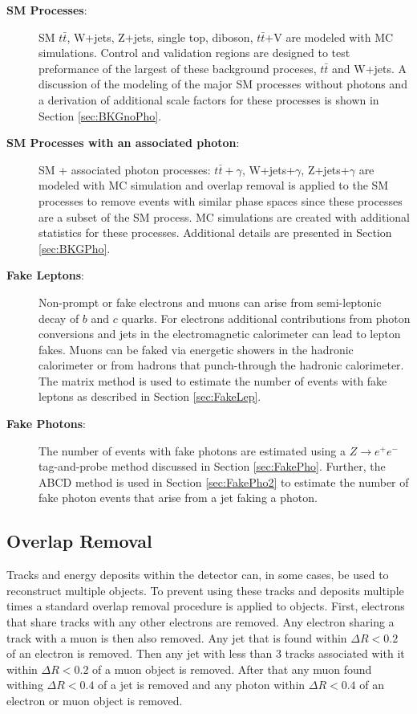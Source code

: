 \begin{description}
\item[\textbf{SM Processes}:]  SM $t\bar{t}$, W+jets, Z+jets, single top, diboson, $t\bar{t}$+V are modeled with MC simulations.  Control and validation regions are designed to test preformance of the largest of these background proceses, $t\bar{t}$ and W+jets.  A discussion of the modeling of the major SM processes without photons and a derivation of additional scale factors for these processes is shown in Section \ref{sec:BKGnoPho}.

\item[\textbf{SM Processes with an associated photon}:] SM + associated photon processes: $t\bar{t}+\gamma$, W+jets+$\gamma$, Z+jets+$\gamma$ are modeled with MC simulation and overlap removal is applied to the SM processes to remove events with similar phase spaces since these processes are a subset of the SM process.  MC simulations are created with additional statistics for these processes.  Additional details are presented in Section \ref{sec:BKGPho}.

\item[\textbf{Fake Leptons}:] Non-prompt or fake electrons and muons can arise from semi-leptonic decay of $b$ and $c$ quarks.  For electrons additional contributions from photon conversions and jets in the electromagnetic calorimeter can lead to lepton fakes.  Muons can be faked via energetic showers in the hadronic calorimeter or from hadrons that punch-through the hadronic calorimeter.  The matrix method is used to estimate the number of events with fake leptons as described in Section \ref{sec:FakeLep}.

\item[\textbf{Fake Photons}:] The number of events with fake photons are estimated using a $Z\rightarrow e^+ e^-$ tag-and-probe method discussed in Section \ref{sec:FakePho}.  Further, the ABCD method is used in Section \ref{sec:FakePho2} to estimate the number of fake photon events that arise from a jet faking a photon.

\end{description}
\subsection{Overlap Removal}
\label{sec:OverlapRemoval}
Tracks and energy deposits within the detector can, in some cases, be used to reconstruct multiple objects.  To prevent using these tracks and deposits multiple times a standard overlap removal procedure is applied to objects.  First, electrons that share tracks with any other electrons are removed.  Any electron sharing a track with a muon is then also removed.  Any jet that is found within  $\Delta R < 0.2$ of an electron is removed.  Then any jet with less than 3 tracks associated with it within $\Delta R < 0.2$ of a muon object is removed.  After that any muon found withing $\Delta R < 0.4$ of a jet is removed and any photon within $\Delta R < 0.4$ of an electron or muon object is removed. %


